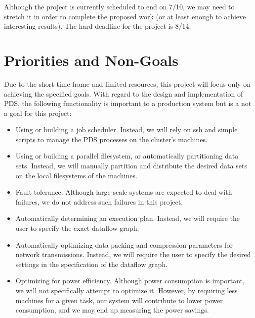 \documentclass{acm_proc_article-sp}
\begin{document}
Although the project is currently scheduled to end on 7/10, we may need to stretch it in order to complete the proposed work (or at least enough to achieve interesting results). The hard deadline for the project is 8/14.

\section{Priorities and Non-Goals}
Due to the short time frame and limited resources, this project will focus only on achieving the specified goals. With regard to the design and implementation of PDS, the following functionality is important to a production system but is a not a goal for this project:
\begin{itemize}
\item Using or building a job scheduler. Instead, we will rely on ssh and simple scripts to manage the PDS processes on the cluster's machines.
\item Using or building a parallel filesystem, or automatically partitioning data sets. Instead, we will manually partition and distribute the desired data sets on the local filesystems of the machines.
\item Fault tolerance. Although large-scale systems are expected to deal with failures, we do not address such failures in this project.
\item Automatically determining an execution plan. Instead, we will require the user to specify the exact dataflow graph.
\item Automatically optimizing data packing and compression parameters for network transmissions. Instead, we will require the user to specify the desired settings in the specification of the dataflow graph.
\item Optimizing for power efficiency. Although power consumption is important, we will not specifically attempt to optimize it. However, by requiring less machines for a given task, our system will contribute to lower power consumption, and we may end up measuring the power savings.
\end{itemize}




\end{document}
